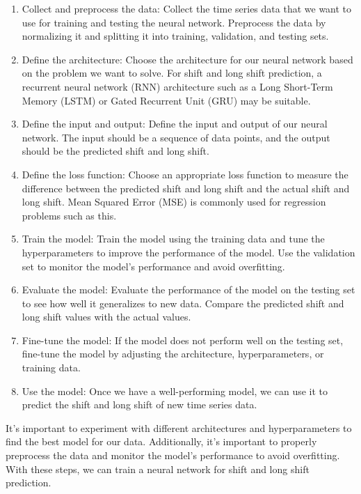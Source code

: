         \begin{enumerate}
            \item Collect and preprocess the data: Collect the time series data that we want to use for training and
            testing the neural network. Preprocess the data by normalizing it and splitting it into training,
            validation, and testing sets.
            \item Define the architecture: Choose the architecture for our neural network based on the problem we
            want to solve. For shift and long shift prediction, a recurrent neural network (RNN) architecture
            such as a Long Short-Term Memory (LSTM) or Gated Recurrent Unit (GRU) may be suitable.
            \item Define the input and output: Define the input and output of our neural network. The input
            should be a sequence of data points, and the output should be the predicted shift and long shift.
            \item Define the loss function: Choose an appropriate loss function to measure the difference
            between the predicted shift and long shift and the actual shift and long shift. Mean Squared Error (MSE) is
            commonly used for regression problems such as this.
            \item Train the model: Train the model using the training data and tune the hyperparameters to improve the
            performance of the model. Use the validation set to monitor the model's performance and avoid overfitting.
            \item Evaluate the model: Evaluate the performance of the model on the testing set to see how well it
            generalizes to new data. Compare the predicted shift and long shift values with the actual values.
            \item Fine-tune the model: If the model does not perform well on the testing set, fine-tune the
            model by adjusting the architecture, hyperparameters, or training data.
            \item Use the model: Once we have a well-performing model, we can use it to predict the shift and long
            shift of new time series data.
        \end{enumerate}
        It's important to experiment with different architectures and hyperparameters to find the best model for
        our data. Additionally, it's important to properly preprocess the data and monitor the model's performance
        to avoid overfitting. With these steps, we can train a neural network for shift and long shift prediction.\\

